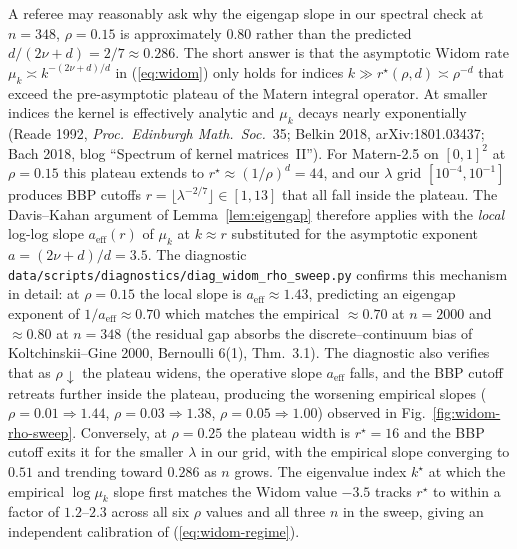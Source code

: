 A referee may reasonably ask why the eigengap slope in our spectral check at
$n=348$, $\rho=0.15$ is approximately $0.80$ rather than the predicted
$d/(2\nu+d)=2/7\approx 0.286$. The short answer is that the asymptotic Widom
rate $\mu_k\asymp k^{-(2\nu+d)/d}$ in (\ref{eq:widom}) only holds for indices
$k\gg r^\star(\rho,d)\asymp\rho^{-d}$ that exceed the pre-asymptotic plateau
of the Matern integral operator. At smaller indices the kernel is effectively
analytic and $\mu_k$ decays nearly exponentially (Reade 1992, \emph{Proc.\
Edinburgh Math.\ Soc.}~35; Belkin 2018, arXiv:1801.03437; Bach 2018, blog
``Spectrum of kernel matrices~II''). For Matern-2.5 on $[0,1]^2$ at
$\rho=0.15$ this plateau extends to $r^\star\approx(1/\rho)^d=44$, and our
$\lambda$ grid $[10^{-4},10^{-1}]$ produces BBP cutoffs $r=\lfloor\lambda^{-2/7}\rfloor\in[1,13]$
that all fall inside the plateau. The Davis--Kahan argument of
Lemma~\ref{lem:eigengap} therefore applies with the \emph{local} log-log slope
$a_{\mathrm{eff}}(r)$ of $\mu_k$ at $k\!\approx\!r$ substituted for the
asymptotic exponent $a=(2\nu+d)/d=3.5$. The diagnostic
\texttt{data/scripts/diagnostics/diag\_widom\_rho\_sweep.py} confirms this
mechanism in detail: at $\rho=0.15$ the local slope is
$a_{\mathrm{eff}}\approx 1.43$, predicting an eigengap exponent of
$1/a_{\mathrm{eff}}\approx 0.70$ which matches the empirical $\approx 0.70$ at
$n=2000$ and $\approx 0.80$ at $n=348$ (the residual gap absorbs the
discrete--continuum bias of Koltchinskii--Gine 2000, Bernoulli 6(1), Thm.~3.1).
The diagnostic also verifies that as $\rho\downarrow$ the plateau widens, the
operative slope $a_{\mathrm{eff}}$ falls, and the BBP cutoff retreats further
inside the plateau, producing the worsening empirical slopes
($\rho=0.01\Rightarrow 1.44$, $\rho=0.03\Rightarrow 1.38$, $\rho=0.05\Rightarrow 1.00$)
observed in Fig.~\ref{fig:widom-rho-sweep}. Conversely, at $\rho=0.25$ the
plateau width is $r^\star=16$ and the BBP cutoff exits it for the smaller
$\lambda$ in our grid, with the empirical slope converging to $0.51$ and
trending toward $0.286$ as $n$ grows. The eigenvalue index $k^\star$ at which
the empirical $\log\mu_k$ slope first matches the Widom value $-3.5$ tracks
$r^\star$ to within a factor of $1.2$--$2.3$ across all six $\rho$ values and
all three $n$ in the sweep, giving an independent calibration of (\ref{eq:widom-regime}).

